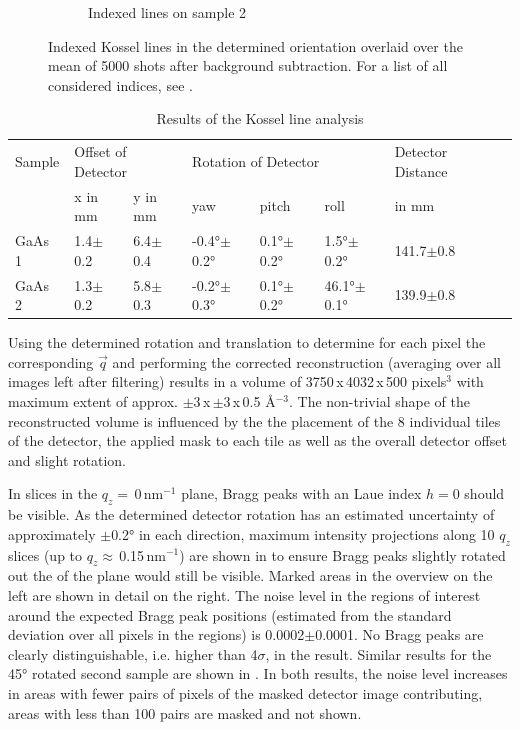 \begin{figure}
\begin{subfigure}{0.35\textwidth}
		\caption{Indexed lines on sample 2}
	\end{subfigure}
	\caption[Kossel lines on GaAs samples]{Indexed Kossel lines in the determined orientation overlaid over the mean of 5000 shots after background subtraction. For a list of all considered indices, see  .}
	\label{fig:kosselgaaslines}
\end{figure}

\begin{table}[]
	\caption{Results of the Kossel line analysis}
	\begin{small}
		\begin{tabular}{llllllll}
			\hline
			Sample & \multicolumn{2}{l}{Offset of Detector} & \multicolumn{3}{l}{Rotation of Detector}  & Detector Distance &  \\
			& x in mm        & y in mm        & yaw              & pitch           & roll           & in mm             &  \\ 
			\hline
			GaAs 1 & 1.4$\pm$0.2    & 6.4$\pm$0.4    & -0.4°$\pm$0.2° & 0.1°$\pm$0.2° & 1.5°$\pm$0.2° & 141.7$\pm$0.8     &  \\
			GaAs 2 & 1.3$\pm$0.2    & 5.8$\pm$0.3    & -0.2°$\pm$0.3° & 0.1°$\pm$0.2° & 46.1°$\pm$0.1° & 139.9$\pm$0.8     &  \\
			\hline
		\end{tabular}
	\end{small}	
	\label{tab:kosselfit}
\end{table}

Using the determined rotation and translation to determine for each pixel the corresponding $\vec{q}$ and performing the corrected reconstruction (averaging over all images left after filtering) results in a volume of 3750\,x\,4032\,x\,500 pixels$^3$ with maximum extent of approx. $\pm$3\,x\,$\pm$3\,x\,0.5 \AA$^{-3}$. The non-trivial shape of the reconstructed volume is influenced by the the placement of the 8 individual tiles of the detector, the applied mask to each tile as well as the overall detector offset and slight rotation.

 In slices in the $q_z=$\,0\,nm$^{-1}$ plane, Bragg peaks with an Laue index $h=0$ should be visible. As the determined detector rotation has an estimated uncertainty of approximately $\pm$0.2° in each direction, maximum intensity projections along 10 $q_z$ slices (up to $q_z\approx$\,0.15\,nm$^{-1}$) are shown in  to ensure Bragg peaks slightly rotated out the of the plane would still be visible. Marked areas in the overview on the left are shown in detail on the right. The noise level in the regions of interest around the expected Bragg peak positions (estimated from the standard deviation over all pixels in the regions) is 0.0002$\pm$0.0001.  No Bragg peaks are clearly distinguishable, i.e. higher than 4$\sigma$,  in the result. Similar results for the 45° rotated second sample are shown in . In both results, the noise level increases in areas with fewer pairs of pixels of the masked detector image contributing, areas with less than 100 pairs are masked and not shown.
 

